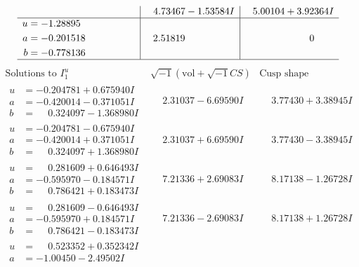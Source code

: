 \documentclass[1p]{elsarticle_modified}
\theoremstyle{definition}
\newcommand{\I}{\sqrt{-1}}
\begin{document}
$$\begin{array}{c|c|c}
 & \phantom{-}4.73467 - 1.53584 I & \phantom{-}5.00104 + 3.92364 I \\ \hline\begin{aligned}
u &= -1.28895\phantom{ +0.000000I} \\
a &= -0.201518\phantom{ +0.000000I} \\
b &= -0.778136\phantom{ +0.000000I}\end{aligned}
 & \phantom{-}2.51819\phantom{ +0.000000I} & \phantom{-0.000000 } 0\\
 \hline 
 \end{array}$$\newpage$$\begin{array}{c|c|c}  
\text{Solutions to }I^u_{1}& \I (\text{vol} + \sqrt{-1}CS) & \text{Cusp shape}\\
 \hline 
\begin{aligned}
u &= -0.204781 + 0.675940 I \\
a &= -0.420014 - 0.371051 I \\
b &= \phantom{-}0.324097 - 1.368980 I\end{aligned}
 & \phantom{-}2.31037 - 6.69590 I & \phantom{-}3.77430 + 3.38945 I \\ \hline\begin{aligned}
u &= -0.204781 - 0.675940 I \\
a &= -0.420014 + 0.371051 I \\
b &= \phantom{-}0.324097 + 1.368980 I\end{aligned}
 & \phantom{-}2.31037 + 6.69590 I & \phantom{-}3.77430 - 3.38945 I \\ \hline\begin{aligned}
u &= \phantom{-}0.281609 + 0.646493 I \\
a &= -0.595970 - 0.184571 I \\
b &= \phantom{-}0.786421 + 0.183473 I\end{aligned}
 & \phantom{-}7.21336 + 2.69083 I & \phantom{-}8.17138 - 1.26728 I \\ \hline\begin{aligned}
u &= \phantom{-}0.281609 - 0.646493 I \\
a &= -0.595970 + 0.184571 I \\
b &= \phantom{-}0.786421 - 0.183473 I\end{aligned}
 & \phantom{-}7.21336 - 2.69083 I & \phantom{-}8.17138 + 1.26728 I \\ \hline\begin{aligned}
u &= \phantom{-}0.523352 + 0.352342 I \\
a &= -1.00450 - 2.49502 I \\

\end{aligned}
\end{array}$$
\end{document}
